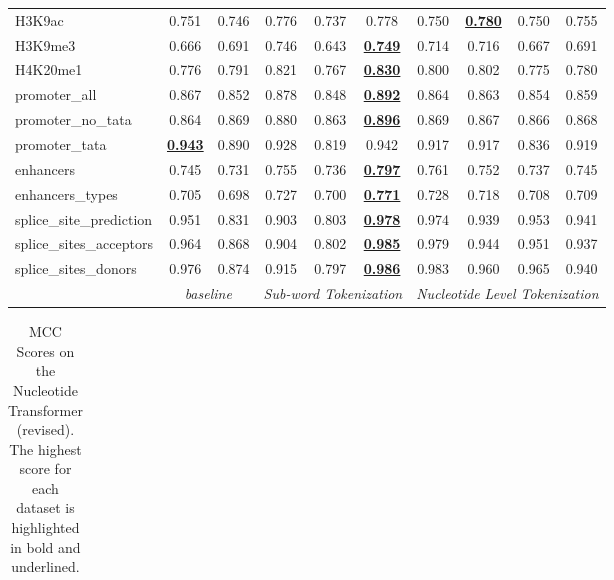 \begin{table*}[h!]
\begin{center}
\begin{tabular}{l|cc|ccc|cccc}
H3K9ac & 0.751 & 0.746 & 0.776 & 0.737 & 0.778 & 0.750 & {\ul \textbf{0.780}} & 0.750 & 0.755 \\
H3K9me3 & 0.666 & 0.691 & 0.746 & 0.643 & {\ul \textbf{0.749}} & 0.714 & 0.716 & 0.667 & 0.691 \\
H4K20me1 & 0.776 & 0.791 & 0.821 & 0.767 & {\ul \textbf{0.830}} & 0.800 & 0.802 & 0.775 & 0.780 \\
promoter\_all & 0.867 & 0.852 & 0.878 & 0.848 & {\ul \textbf{0.892}} & 0.864 & 0.863 & 0.854 & 0.859 \\
promoter\_no\_tata & 0.864 & 0.869 & 0.880 & 0.863 & {\ul \textbf{0.896}} & 0.869 & 0.867 & 0.866 & 0.868 \\
promoter\_tata & {\ul \textbf{0.943}} & 0.890 & 0.928 & 0.819 & 0.942 & 0.917 & 0.917 & 0.836 & 0.919 \\
enhancers & 0.745 & 0.731 & 0.755 & 0.736 & {\ul \textbf{0.797}} & 0.761 & 0.752 & 0.737 & 0.745 \\
enhancers\_types & 0.705 & 0.698 & 0.727 & 0.700 & {\ul \textbf{0.771}} & 0.728 & 0.718 & 0.708 & 0.709 \\
splice\_site\_prediction & 0.951 & 0.831 & 0.903 & 0.803 & {\ul \textbf{0.978}} & 0.974 & 0.939 & 0.953 & 0.941 \\
splice\_sites\_acceptors & 0.964 & 0.868 & 0.904 & 0.802 & {\ul \textbf{0.985}} & 0.979 & 0.944 & 0.951 & 0.937 \\
splice\_sites\_donors & 0.976 & 0.874 & 0.915 & 0.797 & {\ul \textbf{0.986}} & 0.983 & 0.960 & 0.965 & 0.940 \\
\hline
\multicolumn{1}{l|}{} & \multicolumn{2}{c|}{\textit{baseline}} & \multicolumn{3}{c|}{\textit{Sub-word Tokenization}} & \multicolumn{4}{c}{\textit{Nucleotide Level Tokenization}} \\ \hline
\end{tabular}
\end{center}
\end{table*}\begin{table*}[h!]
\small
\begin{center}
\caption{MCC Scores on the Nucleotide Transformer (revised). The highest score for each dataset is highlighted in bold and underlined.}
\label{table: NTv2 Results MCC}
\begin{tabular}{l|cc|ccc|cccc}
\hline

\end{tabular}
\end{center}
\end{table*}
